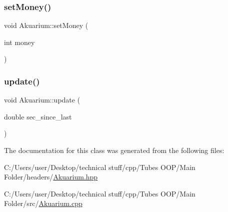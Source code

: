 \mbox{\label{class_akuarium_a6be2d50883019668db71ef5128851202}} 
\subsubsection{\texorpdfstring{set\+Money()}{setMoney()}}
{\footnotesize\ttfamily void Akuarium\+::set\+Money (\begin{DoxyParamCaption}\item[{int}]{money }\end{DoxyParamCaption})}

\mbox{\label{class_akuarium_af7c9d5e5b90bd3c0cef6e91777bb3978}} 
\subsubsection{\texorpdfstring{update()}{update()}}
{\footnotesize\ttfamily void Akuarium\+::update (\begin{DoxyParamCaption}\item[{double}]{sec\+\_\+since\+\_\+last }\end{DoxyParamCaption})}



The documentation for this class was generated from the following files\+:\begin{DoxyCompactItemize}
\item 
C\+:/\+Users/user/\+Desktop/technical stuff/cpp/\+Tubes O\+O\+P/\+Main Folder/headers/\mbox{\hyperlink{_akuarium_8hpp}{Akuarium.\+hpp}}\item 
C\+:/\+Users/user/\+Desktop/technical stuff/cpp/\+Tubes O\+O\+P/\+Main Folder/src/\mbox{\hyperlink{_akuarium_8cpp}{Akuarium.\+cpp}}\end{DoxyCompactItemize}
